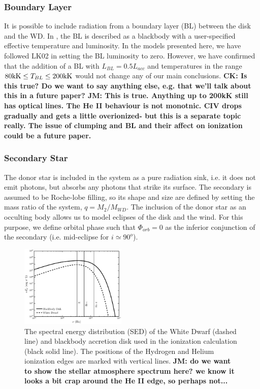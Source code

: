 \documentclass[preprint, a4paper, 11pt]{aastex}
\begin{document}
\subsubsection{Boundary Layer}

It is possible to include radiation from a boundary layer (BL) between
the disk and the WD. In \py, the BL is described as
a blackbody with a user-specified effective temperature and
luminosity. In the models presented here, we have followed LK02 in setting
the BL luminosity to zero. However, we have confirmed that the addition of a
BL with $L_{BL} = 0.5 L_{acc}$ and temperatures in the range $80{\rm
kK} \leq T_{BL} \leq 200{\rm kK}$ would not change any of our main
conclusions. 
{\bf CK: Is this true? Do we want to say anything else, e.g. that we'll
talk about this in a future paper? JM: This is true. Anything up to 200kK
still has optical lines. The He II behaviour is not monotnic. CIV drops
gradually and gets a little overionized- but this is a separate topic really.
The issue of clumping and BL and their affect on ionization could be a 
future paper.}  

\subsubsection{Secondary Star}

The donor star is included in the system as a pure radiation sink, 
i.e. it does not emit photons, but absorbs any photons that strike its
surface. The secondary is assumed to be Roche-lobe filling, so its
shape and size are defined by setting the mass ratio of the system, $q
= M_2/M_{WD}$. The inclusion of the donor star as an occulting body
allows us to model eclipses of the disk and the wind. For this
purpose, we define orbital phase such that $\Phi_{orb} = 0$ as the
inferior conjunction of the secondary (i.e. mid-eclipse for $i \simeq
90^o$).

\begin{figure}
\centering
\includegraphics[width=0.45\textwidth]{figures/sed_figure.eps}
\caption{
The spectral energy distribution (SED) of the 
White Dwarf (dashed line) and blackbody accretion
disk used in the ionization calculation (black solid line).
The positions of the Hydrogen and Helium ionization edges 
are marked with vertical lines.
{\bf JM: do we want to show the stellar atmosphere spectrum here?
we know it looks a bit crap around the He II edge, so perhaps not...
 }
 }
\label{sed}
\end{figure}
\end{document}
